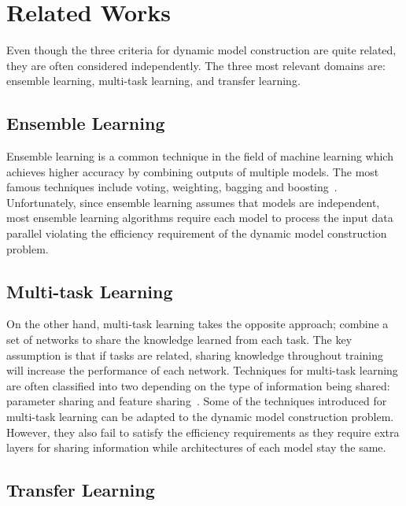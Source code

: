 \documentclass{article}
\begin{document}
\section{Related Works}

Even though the three criteria for dynamic model construction are quite related, they are often considered independently. The three most relevant domains are: ensemble learning, multi-task learning, and transfer learning.

\subsection{Ensemble Learning}
Ensemble learning is a common technique in the field of machine learning which achieves higher accuracy by combining outputs of multiple models. The most famous techniques include voting, weighting, bagging and boosting~\cite{dietterich2000ensemble, breiman1996bagging, freund1996experiments}. Unfortunately, since ensemble learning assumes that models are independent, most ensemble learning algorithms require each model to process the input data parallel violating the efficiency requirement of the dynamic model construction problem.

\subsection{Multi-task Learning}
On the other hand, multi-task learning takes the opposite approach; combine a set of networks to share the knowledge learned from each task. The key assumption is that if tasks are related, sharing knowledge throughout training will increase the performance of each network. Techniques for multi-task learning are often classified into two depending on the type of information being shared: parameter sharing and feature sharing~\cite{ruder2017overview, Caruana1993MultitaskLA, duong2015low, lu2017fully}. Some of the techniques introduced for multi-task learning can be adapted to the dynamic model construction problem. However, they also fail to satisfy the efficiency requirements as they require extra layers for sharing information while architectures of each model stay the same.

\subsection{Transfer Learning}
\end{document}
